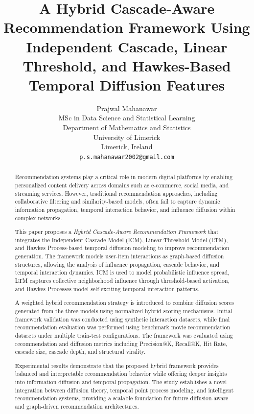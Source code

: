 \documentclass{article}
\title{A Hybrid Cascade-Aware Recommendation Framework Using Independent Cascade, Linear Threshold, and Hawkes-Based Temporal Diffusion Features}
\author{
Prajwal Mahanawar \\
MSc in Data Science and Statistical Learning \\
Department of Mathematics and Statistics \\
University of Limerick \\
Limerick, Ireland \\
\texttt{p.s.mahanawar2002@gmail.com}
}
\begin{document}
\maketitle
\begin{abstract}
Recommendation systems play a critical role in modern digital platforms by enabling personalized content delivery across domains such as e-commerce, social media, and streaming services. However, traditional recommendation approaches, including collaborative filtering and similarity-based models, often fail to capture dynamic information propagation, temporal interaction behavior, and influence diffusion within complex networks.

This paper proposes a \textit{Hybrid Cascade-Aware Recommendation Framework} that integrates the Independent Cascade Model (ICM), Linear Threshold Model (LTM), and Hawkes Process-based temporal diffusion modeling to improve recommendation generation. The framework models user-item interactions as graph-based diffusion structures, allowing the analysis of influence propagation, cascade behavior, and temporal interaction dynamics. ICM is used to model probabilistic influence spread, LTM captures collective neighborhood influence through threshold-based activation, and Hawkes Processes model self-exciting temporal interaction patterns.

A weighted hybrid recommendation strategy is introduced to combine diffusion scores generated from the three models using normalized hybrid scoring mechanisms. Initial framework validation was conducted using synthetic interaction datasets, while final recommendation evaluation was performed using benchmark movie recommendation datasets under multiple train-test configurations. The framework was evaluated using recommendation and diffusion metrics including Precision@K, Recall@K, Hit Rate, cascade size, cascade depth, and structural virality.

Experimental results demonstrate that the proposed hybrid framework provides balanced and interpretable recommendation behavior while offering deeper insights into information diffusion and temporal propagation. The study establishes a novel integration between diffusion theory, temporal point process modeling, and intelligent recommendation systems, providing a scalable foundation for future diffusion-aware and graph-driven recommendation architectures.

\end{abstract}
\end{document}
